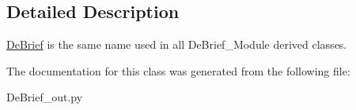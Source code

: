 \subsection{Detailed Description}
\hyperlink{classc_1_1_de_brief__out_1_1_de_brief}{De\+Brief} is the same name used in all De\+Brief\+\_\+\+Module derived classes. 



The documentation for this class was generated from the following file\+:\begin{DoxyCompactItemize}
\item 
De\+Brief\+\_\+out.\+py\end{DoxyCompactItemize}
